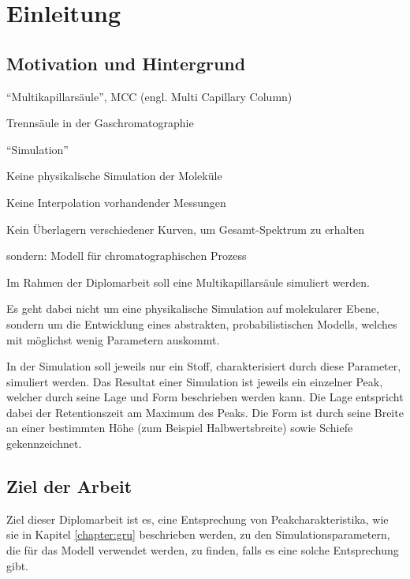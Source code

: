 \label{chapter:ein}

\chapter{Einleitung}

\section{Motivation und Hintergrund}


``Multikapillarsäule'', MCC (engl. Multi Capillary Column)

Trennsäule in der Gaschromatographie

``Simulation''

Keine physikalische Simulation der Moleküle

 Keine Interpolation vorhandender Messungen

 Kein Überlagern verschiedener Kurven, um Gesamt-Spektrum zu erhalten
 
 sondern: Modell für chromatographischen Prozess


Im Rahmen der Diplomarbeit soll eine Multikapillarsäule simuliert werden. 

Es geht dabei nicht um eine physikalische Simulation auf molekularer Ebene, sondern um die Entwicklung eines abstrakten, probabilistischen Modells, welches mit möglichst wenig Parametern auskommt. 

In der Simulation soll jeweils nur ein Stoff, charakterisiert durch diese Parameter, simuliert werden. Das Resultat einer Simulation ist jeweils ein einzelner Peak, welcher durch seine Lage und Form beschrieben werden kann. Die Lage entspricht dabei der Retentionszeit am Maximum des Peaks. Die Form ist durch seine Breite an einer bestimmten Höhe (zum Beispiel Halbwertsbreite) sowie Schiefe gekennzeichnet.


\section{Ziel der Arbeit}

Ziel dieser Diplomarbeit ist es, eine Entsprechung von Peakcharakteristika, wie sie in Kapitel \ref{chapter:gru} beschrieben werden, zu den Simulationsparametern, die für das Modell verwendet werden, zu finden, falls es eine solche Entsprechung gibt.


